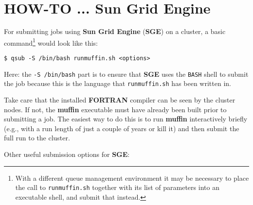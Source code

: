 \documentclass[11pt,fleqn]{book} %
\begin{document}

\newpage


\section{HOW-TO ... Sun Grid Engine}\label{how-to-sge}
\vspace{2mm}


For submitting jobs using \textbf{Sun Grid Engine} (\textbf{SGE}) on a cluster, a basic command\footnote{With a different queue management environment it may be necessary to place the call to \texttt{runmuffin.sh} together with its list of parameters into an executable shell, and submit that instead. } would look like this:
\vspace{-2pt}\begin{verbatim}
$ qsub -S /bin/bash runmuffin.sh <options>
\end{verbatim}\vspace{-2pt}
Here: the \texttt{-S /bin/bash} part is to ensure that \textbf{SGE} uses the \texttt{BASH} shell to submit the job because this is the language that \texttt{runmuffin.sh} has been written in.

Take care that the installed \textbf{FORTRAN} compiler can be seen by the cluster nodes. If not, the \textbf{muffin} executable must have already been built prior to submitting a job. The easiest way to do this is to run \textbf{muffin} interactively briefly (e.g., with a run length of just a couple of years or kill it) and then submit the full run to the cluster.

Other useful submission options for \textbf{SGE}:
\end{document}

